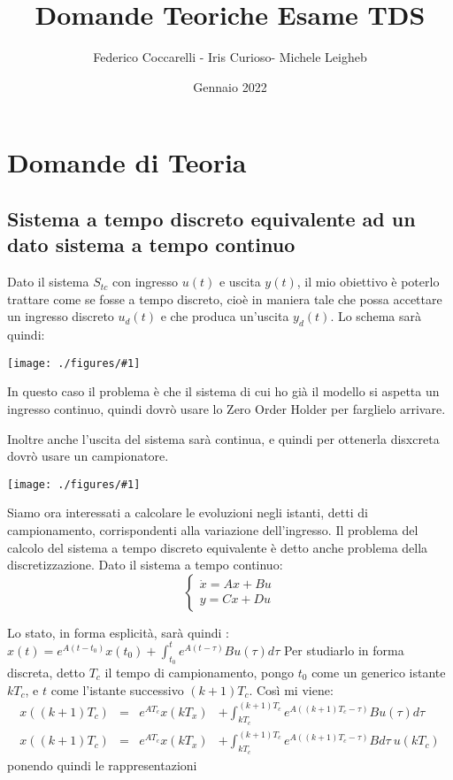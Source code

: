 \documentclass{article}
\title{Domande Teoriche Esame TDS}
\author{Federico Coccarelli - Iris Curioso- Michele Leigheb}
\date{Gennaio 2022}
\newcommand{\incfig}[2]{%
	\texttt{[image: ./figures/\#1]}%
}
\begin{document}
\large
\maketitle

\tableofcontents{}


\section{Domande di Teoria}

\subsection{Sistema a tempo discreto equivalente ad un dato sistema a tempo continuo}
Dato il sistema $S_{tc}$ con ingresso $u(t)$ e uscita $y(t)$, il mio obiettivo è poterlo trattare come se fosse a tempo discreto, cioè in maniera tale
che possa accettare un ingresso discreto $u_d(t)$ e che produca un'uscita $y_d(t)$.
Lo schema sarà quindi:

\incfig{ZOH.jpeg}{0.4}

In questo caso il problema è che il sistema di cui ho già il modello si aspetta un ingresso continuo, quindi dovrò usare lo Zero Order Holder per
farglielo arrivare.

Inoltre anche l'uscita del sistema sarà continua, e quindi per ottenerla disxcreta dovrò usare un campionatore.

\incfig{discreto.jpeg}{0.4}

Siamo ora interessati a calcolare le evoluzioni negli istanti, detti di campionamento, corrispondenti alla variazione dell'ingresso.
Il problema del calcolo del sistema a tempo discreto equivalente è detto anche problema della discretizzazione. Dato il sistema a tempo continuo:
\[
\begin{cases}
    \dot{x} = Ax+Bu\\
    y = Cx+Du
\end{cases}
\]

Lo stato, in forma esplicità, sarà quindi : \(\displaystyle x(t) = e^{A(t-t_0)}x(t_0) + \int_{t_0}^{t} e^{A(t-\tau)}Bu(\tau)d\tau\)
Per studiarlo in forma discreta, detto $T_c$ il tempo di campionamento, pongo $t_0$ come un generico istante $kT_c$, e $t$ come l'istante successivo
$(k+1)T_c$. Così mi viene:
\begin{align*} 
    x((k+1)T_c) &=& e^{AT_c}x(kT_x) &+ \int_{kT_c}^{(k+1)T_c} e ^{A((k+1)T_c-\tau)}B u(\tau) d\tau \\
    x((k+1)T_c) &=& e^{AT_c}x(kT_x) &+ \int_{kT_c}^{(k+1)T_c} e ^{A((k+1)T_c-\tau)}B  d\tau \ u(kT_c)
\end{align*}
ponendo quindi le rappresentazioni 
\end{document}
